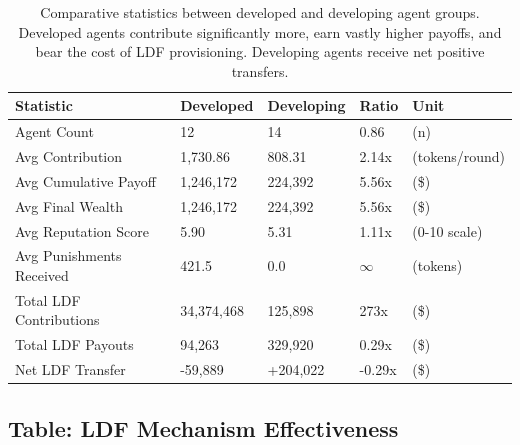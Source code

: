 \documentclass[12pt]{article}
\begin{document}
\begin{table}[h]
\centering
\small
\begin{tabularx}{0.8\textwidth}{lXXXX}
\toprule
\textbf{Statistic} & \textbf{Developed} & \textbf{Developing} & \textbf{Ratio} & \textbf{Unit} \\
\midrule
Agent Count & 12 & 14 & 0.86 & (n) \\
Avg Contribution & 1,730.86 & 808.31 & 2.14x & (tokens/round) \\
Avg Cumulative Payoff & 1,246,172 & 224,392 & 5.56x & (\$) \\
Avg Final Wealth & 1,246,172 & 224,392 & 5.56x & (\$) \\
Avg Reputation Score & 5.90 & 5.31 & 1.11x & (0-10 scale) \\
Avg Punishments Received & 421.5 & 0.0 & $\infty$ & (tokens) \\
Total LDF Contributions & 34,374,468 & 125,898 & 273x & (\$) \\
Total LDF Payouts & 94,263 & 329,920 & 0.29x & (\$) \\
Net LDF Transfer & -59,889 & +204,022 & -0.29x & (\$) \\
\bottomrule
\end{tabularx}
\caption{Comparative statistics between developed and developing agent groups. Developed agents contribute significantly more, earn vastly higher payoffs, and bear the cost of LDF provisioning. Developing agents receive net positive transfers.}
\end{table}

\subsection*{Table: LDF Mechanism Effectiveness}
\end{document}

